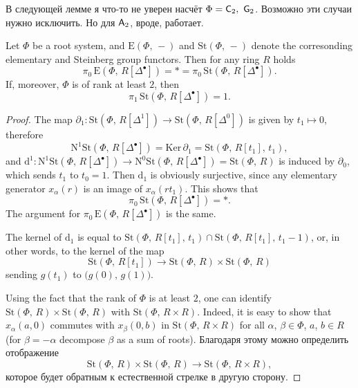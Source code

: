 \documentclass[12pt,a4paper]{article}
\begin{document}
В следующей лемме я что-то не уверен насчёт $\Phi=\mathsf{C}_2,\ \mathsf{G}_2$. Возможно эти случаи нужно исключить. Но для $\mathsf{A}_2$, вроде, работает.

\begin{lemma}
Let $\Phi$ be a root system, and $\mathrm E(\Phi,\,-)$ and $\mathrm{St}(\Phi,\,-)$ denote the corresonding elementary and Steinberg group functors. Then for any ring $R$ holds
$$
\pi_0\,\mathrm E(\Phi,\,R[\Delta^\bullet])=*=\pi_0\,\mathrm{St}(\Phi,\,R[\Delta^\bullet]).
$$
If, moreover, $\Phi$ is of rank at least $2$, then
$$
\pi_1\,\mathrm{St}(\Phi,\,R[\Delta^\bullet])=1.
$$
\begin{proof}
The map $\partial_1\colon\mathrm{St}(\Phi,\,R[\Delta^1])\rightarrow\mathrm{St}(\Phi,\,R[\Delta^0])$ is given by $t_1\mapsto0$, therefore 
$$
\mathrm N^1\mathrm{St}(\Phi,\,R[\Delta^\bullet])=\mathrm{Ker}\,\partial_1=\mathrm{St}(\Phi,\,R[t_1],\,t_1),
$$
and $\mathrm d^1\colon\mathrm N^1\mathrm{St}(\Phi,\,R[\Delta^\bullet])\rightarrow\mathrm N^0\mathrm{St}(\Phi,\,R[\Delta^\bullet])=\mathrm{St}(\Phi,\,R)$ is induced by $\partial_0$, which sends $t_1$ to $t_0=1$. %
Then $\mathrm d_1$ is obviously surjective, since any elementary generator $x_\alpha(r)$ is an image of $x_\alpha(rt_1)$. This shows that $$\pi_0\,\mathrm{St}(\Phi,\,R[\Delta^\bullet])=*.$$ The argument for $\pi_0\,\mathrm E(\Phi,\,R[\Delta^\bullet])$ is the same.

The kernel of $\mathrm d_1$ is equal to $\mathrm{St}(\Phi,\,R[t_1],\,t_1)\cap\mathrm{St}(\Phi,\,R[t_1],\,t_1-1)$, or, in other words, to the kernel of the map
$$
\mathrm{St}(\Phi,\,R[t_1])\rightarrow\mathrm{St}(\Phi,\,R)\times\mathrm{St}(\Phi,\,R)
$$
sending $g(t_1)$ to $\big(g(0),\,g(1)\big)$. 

Using the fact that the rank of $\Phi$ is at least $2$, one can identify $\mathrm{St}(\Phi,\,R)\times\mathrm{St}(\Phi,\,R)$ with $\mathrm{St}(\Phi,\,R\times R)$. Indeed, it is easy to show that $x_{\alpha}(a,0)$ commutes with $x_\beta(0,b)$ in $\mathrm{St}(\Phi,\,R\times R)$ for all $\alpha$, $\beta\in\Phi$, $a$, $b\in R$ (for $\beta=-\alpha$ decompose $\beta$ as a sum of roots). Благодаря этому можно определить отображение
$$
\mathrm{St}(\Phi,\,R)\times\mathrm{St}(\Phi,\,R)\rightarrow\mathrm{St}(\Phi,\,R\times R),
$$
которое будет обратным к естественной стрелке в другую сторону.


\end{proof}
\end{lemma}
\end{document}
